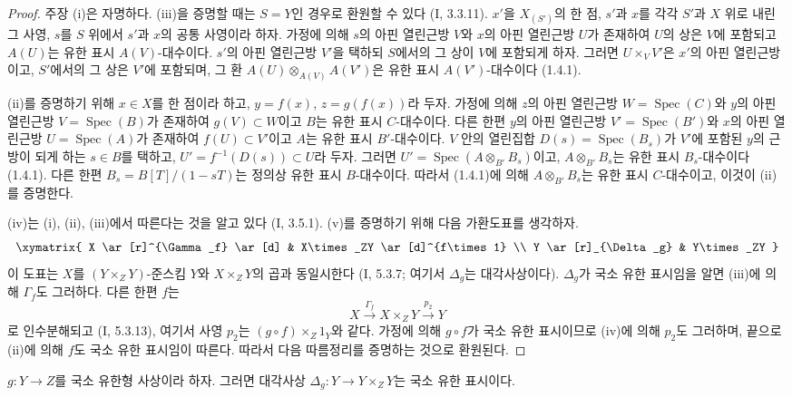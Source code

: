 \begin{proof}
주장 (i)은 자명하다. (iii)을 증명할 때는 $S=Y$인 경우로 환원할 수
있다 (I, 3.3.11). $x'$을 $X_{(S')}$의 한 점, $s'$과 $x$를 각각
$S'$과 $X$ 위로 내린 그 사영, $s$를 $S$ 위에서 $s'$과 $x$의 공통
사영이라 하자. 가정에 의해 $s$의 아핀 열린근방 $V$와 $x$의 아핀
열린근방 $U$가 존재하여 $U$의 상은 $V$에 포함되고 $A(U)$는 유한
표시 $A(V)$-대수이다. $s'$의 아핀 열린근방 $V'$을 택하되 $S$에서의
그 상이 $V$에 포함되게 하자. 그러면 $U\times_VV'$은 $x'$의 아핀
열린근방이고, $S'$에서의 그 상은 $V'$에 포함되며, 그 환
$A(U)\otimes_{A(V)}A(V')$은 유한 표시 $A(V')$-대수이다 (1.4.1).

(ii)를 증명하기 위해 $x\in X$를 한 점이라 하고, $y=f(x)$,
$z=g(f(x))$라 두자. 가정에 의해 $z$의 아핀 열린근방
$W=\operatorname{Spec}(C)$와 $y$의 아핀 열린근방
$V=\operatorname{Spec}(B)$가 존재하여 $g(V)\subset W$이고 $B$는
유한 표시 $C$-대수이다. 다른 한편 $y$의 아핀 열린근방
$V'=\operatorname{Spec}(B')$와 $x$의 아핀 열린근방
$U=\operatorname{Spec}(A)$가 존재하여 $f(U)\subset V'$이고 $A$는
유한 표시 $B'$-대수이다. $V$ 안의 열린집합
$D(s)=\operatorname{Spec}(B_s)$가 $V'$에 포함된 $y$의 근방이 되게
하는 $s\in B$를 택하고, $U'=f^{-1}(D(s))\subset U$라 두자. 그러면
$U'=\operatorname{Spec}(A\otimes_{B'}B_s)$이고,
$A\otimes_{B'}B_s$는 유한 표시 $B_s$-대수이다 (1.4.1). 다른 한편
$B_s=B[T]/(1-sT)$는 정의상 유한 표시 $B$-대수이다. 따라서
(1.4.1)에 의해 $A\otimes_{B'}B_s$는 유한 표시 $C$-대수이고,
이것이 (ii)를 증명한다.

(iv)는 (i), (ii), (iii)에서 따른다는 것을 알고 있다 (I, 3.5.1).
(v)를 증명하기 위해 다음 가환도표를 생각하자.
\[
\xymatrix{
X \ar[r]^{\Gamma_f} \ar[d] & X\times_ZY \ar[d]^{f\times 1} \\
Y \ar[r]_{\Delta_g} & Y\times_ZY
}
\]
이 도표는 $X$를 $(Y\times_ZY)$-준스킴 $Y$와 $X\times_ZY$의 곱과
동일시한다 (I, 5.3.7; 여기서 $\Delta_g$는 대각사상이다).
$\Delta_g$가 국소 유한 표시임을 알면 (iii)에 의해 $\Gamma_f$도
그러하다. 다른 한편 $f$는
\[
  X\xrightarrow{\Gamma_f}X\times_ZY\xrightarrow{p_2}Y
\]
로 인수분해되고 (I, 5.3.13), 여기서 사영 $p_2$는
$(g\circ f)\times_Z1_Y$와 같다. 가정에 의해 $g\circ f$가 국소
유한 표시이므로 (iv)에 의해 $p_2$도 그러하며, 끝으로 (ii)에 의해
$f$도 국소 유한 표시임이 따른다. 따라서 다음 따름정리를 증명하는
것으로 환원된다.
\end{proof}

\begin{corollary}[1.4.3.1]
\label{IV.1.4.3.1-fr}
$g:Y\to Z$를 국소 유한형 사상이라 하자. 그러면 대각사상
$\Delta_g:Y\to Y\times_ZY$는 국소 유한 표시이다.
\end{corollary}

